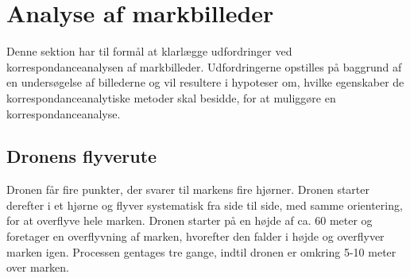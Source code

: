\chapter{Analyse af markbilleder} \label{sec:mark}
Denne sektion har til formål at klarlægge udfordringer ved korrespondanceanalysen af markbilleder. Udfordringerne opstilles på baggrund af en undersøgelse af billederne og vil resultere i hypoteser om, hvilke egenskaber de korrespondanceanalytiske metoder skal besidde, for at muliggøre en korrespondanceanalyse.
\section{Dronens flyverute}
Dronen får fire punkter, der svarer til markens fire hjørner. Dronen starter derefter i et hjørne og flyver systematisk fra side til side, med samme orientering, for at overflyve hele marken. Dronen starter på en højde af ca. 60 meter og foretager en overflyvning af marken, hvorefter den falder i højde og overflyver marken igen. Processen gentages tre gange, indtil dronen er omkring 5-10 meter over marken. 
